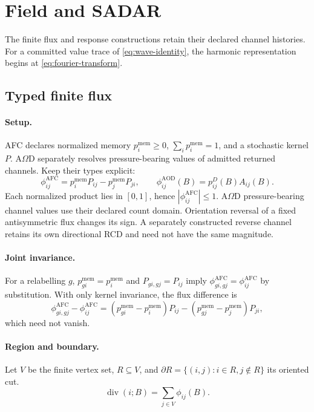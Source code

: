 
\section{Field and SADAR}
\label{sec:stokes-sadar-harmonic}
\label{sec:afc-stokes-seed}
\label{subsec:afc-stokes-identity}
The finite flux and response constructions retain their declared channel histories.
For a committed value trace of \eqref{eq:wave-identity}, the harmonic
representation begins at \eqref{eq:fourier-transform}.
\subsection{Typed finite flux}
\paragraph{Setup.}
AFC declares normalized memory \(p_i^{\mathrm{mem}}\ge0\), \(\sum_i p_i^{\mathrm{mem}}=1\),
and a stochastic kernel \(P\). A\(\Omega\)D separately resolves pressure-bearing
values of admitted returned channels. Keep their types explicit:
\begin{equation}
\phi^{\mathrm{AFC}}_{ij}=p_i^{\mathrm{mem}}P_{ij}-p_j^{\mathrm{mem}}P_{ji},
\qquad \phi^{\mathrm{AOD}}_{ij}(B)=p^D_{ij}(B)A_{ij}(B).
\label{eq:flux-types}
\end{equation}
Each normalized product lies in \([0,1]\), hence
\(|\phi^{\mathrm{AFC}}_{ij}|\le1\). A\(\Omega\)D pressure-bearing channel values
use their declared count domain. Orientation reversal of a
fixed antisymmetric flux changes its sign. A separately constructed reverse
channel retains its own directional RCD and need not have the same magnitude.

\paragraph{Joint invariance.}
For a relabelling \(g\), \(p^{\mathrm{mem}}_{gi}=p^{\mathrm{mem}}_i\) and
\(P_{gi,gj}=P_{ij}\) imply \(\phi^{\mathrm{AFC}}_{gi,gj}=\phi^{\mathrm{AFC}}_{ij}\)
by substitution. With only kernel invariance, the flux difference is
\[
\phi^{\mathrm{AFC}}_{gi,gj}-\phi^{\mathrm{AFC}}_{ij}
=(p^{\mathrm{mem}}_{gi}-p^{\mathrm{mem}}_i)P_{ij}
 -(p^{\mathrm{mem}}_{gj}-p^{\mathrm{mem}}_j)P_{ji},
\]
which need not vanish.

\paragraph{Region and boundary.}
Let \(V\) be the finite vertex set, \(R\subseteq V\), and
\(\partial R=\{(i,j):i\in R,j\notin R\}\) its oriented cut.
\begin{equation}
\operatorname{div}(i;B)=\sum_{j\in V}\phi_{ij}(B).
\label{eq:b-scoped-divergence}
\end{equation}
